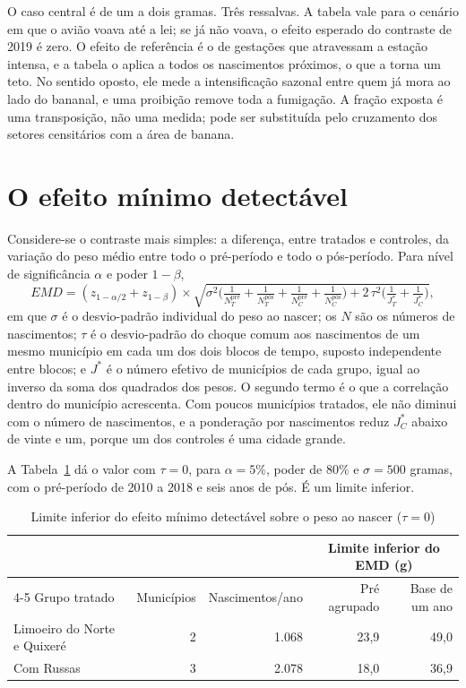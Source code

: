 O caso central é de um a dois gramas. Três ressalvas. A tabela vale para o
cenário em que o avião voava até a lei; se já não voava, o efeito esperado do
contraste de 2019 é zero. O efeito de referência é o de gestações que
atravessam a estação intensa, e a tabela o aplica a todos os nascimentos
próximos, o que a torna um teto. No sentido oposto, ele mede a intensificação
sazonal entre quem já mora ao lado do bananal, e uma proibição remove toda a
fumigação. A fração exposta é uma transposição, não uma medida; pode ser
substituída pelo cruzamento dos setores censitários com a área de banana.

\section{O efeito mínimo detectável}

Considere-se o contraste mais simples: a diferença, entre tratados e controles,
da variação do peso médio entre todo o pré-período e todo o pós-período. Para
nível de significância $\alpha$ e poder $1-\beta$,
\[
EMD = (z_{1-\alpha/2} + z_{1-\beta}) \times
\sqrt{\sigma^2\Big(\tfrac{1}{N_{T}^{\text{pré}}} + \tfrac{1}{N_{T}^{\text{pós}}} +
\tfrac{1}{N_{C}^{\text{pré}}} + \tfrac{1}{N_{C}^{\text{pós}}}\Big) + 2\,\tau^2\Big(\tfrac{1}{J_T^{*}}+\tfrac{1}{J_C^{*}}\Big)},
\]
em que $\sigma$ é o desvio-padrão individual do peso ao nascer; os $N$ são os
números de nascimentos; $\tau$ é o desvio-padrão do choque comum aos nascimentos
de um mesmo município em cada um dos dois blocos de tempo, suposto independente
entre blocos; e $J^{*}$ é o número efetivo de municípios de cada grupo, igual
ao inverso da soma dos quadrados dos pesos. O segundo termo é o que a
correlação dentro do município acrescenta. Com poucos municípios tratados, ele
não diminui com o número de nascimentos, e a ponderação por nascimentos reduz
$J_C^{*}$ abaixo de vinte e um, porque um dos controles é uma cidade grande.

A Tabela~\ref{tab:emd} dá o valor com $\tau = 0$, para $\alpha = 5\%$, poder de
80\% e $\sigma = 500$ gramas, com o pré-período de 2010 a 2018 e seis anos de
pós. É um limite inferior.

\begin{table}[ht]
\centering\small
\caption{Limite inferior do efeito mínimo detectável sobre o peso ao nascer
($\tau = 0$)}
\label{tab:emd}
\begin{tabular}{@{}lrrrr@{}}
\toprule
 & & & \multicolumn{2}{c}{Limite inferior do EMD (g)} \\
\cmidrule(l){4-5}
Grupo tratado & Municípios & Nascimentos/ano & Pré agrupado & Base de um ano \\
\midrule
Limoeiro do Norte e Quixeré & 2 & 1.068 & 23,9 & 49,0 \\
Com Russas                   & 3 & 2.078 & 18,0 & 36,9 \\
\bottomrule
\end{tabular}
\end{table}

